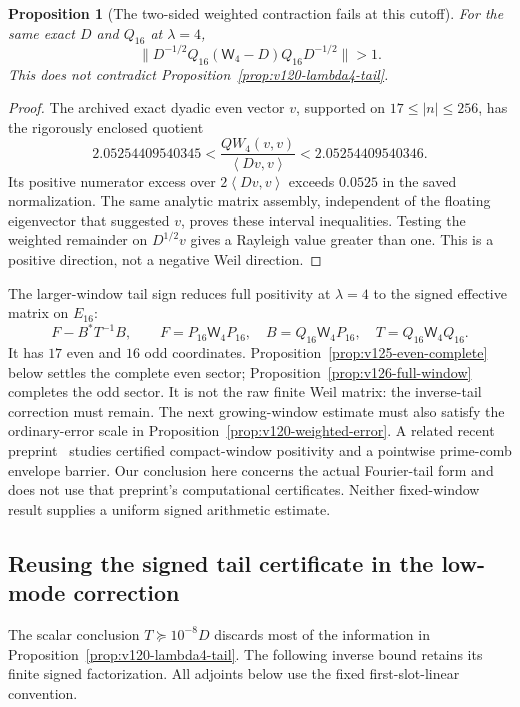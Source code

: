 \documentclass[11pt]{article}
\newtheorem{proposition}[theorem]{Proposition}
\theoremstyle{remark}
\newcommand{\ip}[2]{\left\langle #1,#2\right\rangle}
\begin{document}
\begin{proposition}[The two-sided weighted contraction fails at this cutoff]
\label{prop:v120-norm-counterexample}
For the same exact $D$ and $Q_{16}$ at $\lambda=4$,
\[
 \|D^{-1/2}Q_{16}(\mathsf W_4-D)Q_{16}D^{-1/2}\|>1.
\]
This does not contradict Proposition~\ref{prop:v120-lambda4-tail}.
\end{proposition}
\begin{proof}
The archived exact dyadic even vector $v$, supported on
$17\le|n|\le256$, has the rigorously enclosed quotient
\[
 2.05254409540345<\frac{QW_4(v,v)}{\ip{Dv}{v}}
                         <2.05254409540346.
\]
Its positive numerator excess over $2\ip{Dv}{v}$ exceeds
$0.0525$ in the saved normalization. The same analytic matrix
assembly, independent of the floating eigenvector that suggested
$v$, proves these interval inequalities. Testing the weighted
remainder on $D^{1/2}v$ gives a Rayleigh value greater than one.
This is a positive direction, not a negative Weil direction.
\end{proof}

The larger-window tail sign reduces full positivity at $\lambda=4$
to the signed effective matrix on
$E_{16}$:
\[
 F-B^*T^{-1}B,\qquad
 F=P_{16}\mathsf W_4P_{16},\quad B=Q_{16}\mathsf W_4P_{16},
 \quad T=Q_{16}\mathsf W_4Q_{16}.
\]
It has $17$ even and $16$ odd coordinates.
Proposition~\ref{prop:v125-even-complete} below settles the complete
even sector; Proposition~\ref{prop:v126-full-window} completes the
odd sector. It is not the raw finite
Weil matrix: the inverse-tail correction must remain.
The next growing-window estimate must also satisfy the ordinary-error
scale in Proposition~\ref{prop:v120-weighted-error}.
A related recent preprint~\cite{Zhu2026} studies certified
compact-window positivity and a pointwise prime-comb envelope barrier.
Our conclusion here concerns the actual Fourier-tail form and does
not use that preprint's computational certificates. Neither fixed-window
result supplies a uniform signed arithmetic estimate.

\subsection*{Reusing the signed tail certificate in the low-mode correction}
The scalar conclusion $T\succeq10^{-8}D$ discards most of the
information in Proposition~\ref{prop:v120-lambda4-tail}. The following
inverse bound retains its finite signed factorization. All adjoints
below use the fixed first-slot-linear convention.
\end{document}
